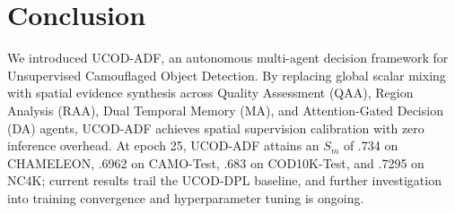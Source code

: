 \documentclass[journal,twoside,web]{IEEEtran}
\newcommand{\methodname}{UCOD-ADF}
\begin{document}
\section{Conclusion}
\label{sec:conclusion}

We introduced \methodname{}, an autonomous multi-agent decision framework for Unsupervised Camouflaged Object Detection. By replacing global scalar mixing with spatial evidence synthesis across Quality Assessment (QAA), Region Analysis (RAA), Dual Temporal Memory (MA), and Attention-Gated Decision (DA) agents, \methodname{} achieves spatial supervision calibration with zero inference overhead. At epoch 25, \methodname{} attains an $S_m$ of .734 on CHAMELEON, .6962 on CAMO-Test, .683 on COD10K-Test, and .7295 on NC4K; current results trail the UCOD-DPL baseline, and further investigation into training convergence and hyperparameter tuning is ongoing.
\end{document}
